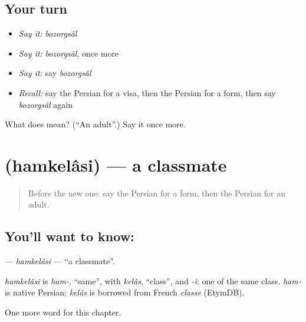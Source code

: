 \subsection*{Your turn}
\begin{itemize}
\raggedright
  \item \emph{Say it:} \emph{bozorgsâl}
  \item \emph{Say it:} \emph{bozorgsâl}, once more
  \item \emph{Say it:} say \emph{bozorgsâl}
  \item \emph{Recall:} say the Persian for a visa, then the Persian for a form, then say \emph{bozorgsâl} again
\end{itemize}

\begin{tcolorbox}[breakable,colback=teal!4,colframe=teal!35!black,title={Before you move on}]
What does  mean? (\textquotedblleft{}An adult\textquotedblright{}.) Say it once more.
\end{tcolorbox}
\section[\texorpdfstring{\fa{همکلاسی} (hamkelâsi)}{همکلاسی (hamkelâsi)}]{ (hamkelâsi) — a classmate}

\label{lesson:FA-C169-hamkelasi}



\begin{quote}
Before the new one: say the Persian for a form, then the Persian for an adult.
\end{quote}

\subsection*{You'll want to know: }
\textbf{} — \emph{hamkelâsi} — \textquotedblleft{}a classmate\textquotedblright{}.

\begin{cousinweb}
\emph{hamkelâsi} is \emph{ham-}, \textquotedblleft{}same\textquotedblright{}, with \emph{kelâs}, \textquotedblleft{}class\textquotedblright{}, and \emph{-i}: one of the same class. \emph{ham-} is native Persian; \emph{kelâs} is borrowed from French \emph{classe} (EtymDB).
\end{cousinweb}

\begin{grammarlens}[title={What you've built}]
One more word for this chapter.
\end{grammarlens}

